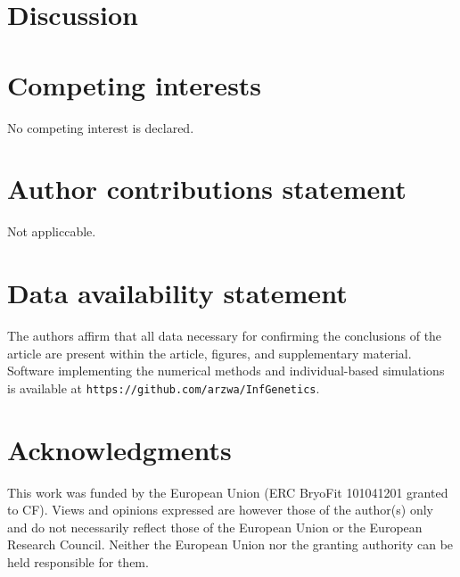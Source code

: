 \documentclass[unnumsec,webpdf,modern,large]{_oup-authoring-template}
\theoremstyle{thmstyleone}%
\theoremstyle{thmstyletwo}%
\theoremstyle{thmstylethree}%
\begin{document}
\section*{Discussion}

\section*{Competing interests}
No competing interest is declared.

\section*{Author contributions statement}
Not appliccable.

\section*{Data availability statement}

The authors affirm that all data necessary for confirming the conclusions of
the article are present within the article, figures, and supplementary
material. Software implementing the numerical methods and individual-based
simulations is available at \texttt{https://github.com/arzwa/InfGenetics}.

\section*{Acknowledgments}

This work was funded by the European Union (ERC BryoFit 101041201 granted to
CF). Views and opinions expressed are however those of the author(s) only and
do not necessarily reflect those of the European Union or the European Research
Council. Neither the European Union nor the granting authority can be held
responsible for them.


\begin{appendices}

\end{appendices}

%





\clearpage
\setcounter{page}{1}


\clearpage
\renewcommand{\thefigure}{S\arabic{figure}}
\renewcommand{\thesection}{S\arabic{section}}
\renewcommand{\thealgorithm}{S\arabic{algorithm}}
\setcounter{figure}{0}
\setcounter{section}{0}
\setcounter{equation}{0}
\setcounter{algorithm}{0}
\end{document}
